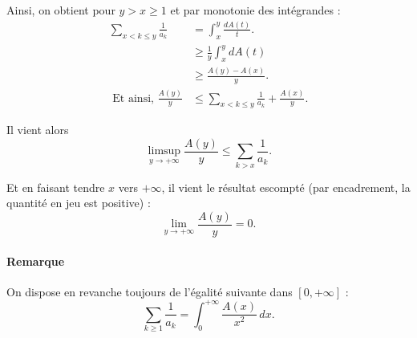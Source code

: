 Ainsi, on obtient pour $y>x\geq 1$ et par monotonie des intégrandes :
\begin{align*} 
\sum_{x<k\leq y}\frac{1}{a_{k}} & =\int_{x}^{y}\frac{dA(t)}{t}.\\
& \geq \frac{1}{y}\int_{x}^{y}dA(t)\\
& \geq \frac{A(y)-A(x)}{y}.\\
\mbox{ Et ainsi, } \frac{A(y)}{y} & \leq \sum_{x<k\leq y}\frac{1}{a_{k}}+ \frac{A(x)}{y}.
\end{align*}

Il vient alors $$\limsup_{y\rightarrow +\infty}\frac{A(y)}{y} \leq \sum_{k>x}\frac{1}{a_{k}}.$$

Et en faisant tendre $x$ vers $+\infty$, il vient le résultat escompté (par encadrement, la quantité en jeu est positive) : $$\lim_{y\rightarrow +\infty}\frac{A(y)}{y}=0.$$

\paragraph{Remarque} %
On dispose en revanche toujours de l'égalité suivante dans $[0,+\infty]$ :
\[
\sum_{k\geqslant 1} \frac1{a_k} = \int_0^{+\infty} \frac{A(x)}{x^2}\,dx.
\]